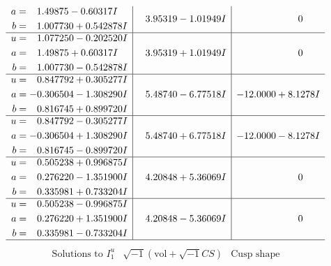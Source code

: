 \documentclass[1p]{elsarticle_modified}
\theoremstyle{definition}
\newcommand{\I}{\sqrt{-1}}
\begin{document}
$$\begin{array}{c|c|c}
\begin{aligned}
a &= \phantom{-}1.49875 - 0.60317 I \\
b &= \phantom{-}1.007730 + 0.542878 I\end{aligned}
 & \phantom{-}3.95319 - 1.01949 I & \phantom{-0.000000 } 0 \\ \hline\begin{aligned}
u &= \phantom{-}1.077250 - 0.202520 I \\
a &= \phantom{-}1.49875 + 0.60317 I \\
b &= \phantom{-}1.007730 - 0.542878 I\end{aligned}
 & \phantom{-}3.95319 + 1.01949 I & \phantom{-0.000000 } 0 \\ \hline\begin{aligned}
u &= \phantom{-}0.847792 + 0.305277 I \\
a &= -0.306504 - 1.308290 I \\
b &= \phantom{-}0.816745 + 0.899720 I\end{aligned}
 & \phantom{-}5.48740 - 6.77518 I & -12.0000 + 8.1278 I \\ \hline\begin{aligned}
u &= \phantom{-}0.847792 - 0.305277 I \\
a &= -0.306504 + 1.308290 I \\
b &= \phantom{-}0.816745 - 0.899720 I\end{aligned}
 & \phantom{-}5.48740 + 6.77518 I & -12.0000 - 8.1278 I \\ \hline\begin{aligned}
u &= \phantom{-}0.505238 + 0.996875 I \\
a &= \phantom{-}0.276220 - 1.351900 I \\
b &= \phantom{-}0.335981 + 0.733204 I\end{aligned}
 & \phantom{-}4.20848 + 5.36069 I & \phantom{-0.000000 } 0 \\ \hline\begin{aligned}
u &= \phantom{-}0.505238 - 0.996875 I \\
a &= \phantom{-}0.276220 + 1.351900 I \\
b &= \phantom{-}0.335981 - 0.733204 I\end{aligned}
 & \phantom{-}4.20848 - 5.36069 I & \phantom{-0.000000 } 0\\
 \hline 
 \end{array}$$\newpage$$\begin{array}{c|c|c}  
\text{Solutions to }I^u_{1}& \I (\text{vol} + \sqrt{-1}CS) & \text{Cusp shape}\\
 \hline 
\begin{aligned}

\end{aligned}
\end{array}$$
\end{document}
